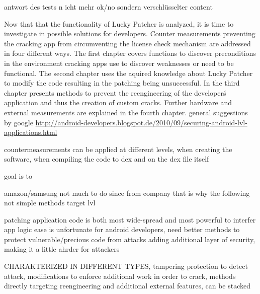 antwort des tests n icht mehr ok/no sondern verschlüsselter content



Now that that the functionality of Lucky Patcher is analyzed, it is time to investigate in possible solutions for developers. Counter measurements preventing the cracking app from circumventing the license check mechanism are addressed in four different ways.\newline
The first chapter covers functions to discover preconditions in the environment cracking apps use to discover weaknesses or need to be functional. The second chapter uses the aquired knowledge about Lucky Patcher to modify the code resulting in the patching being unsuccessful. In the third chapter presents methods to prevent the reengineering of the developer\'s application and thus the creation of custom cracks. Further hardware and external measurements are explained in the fourth chapter.\newline
general suggestions by google  \url{http://android-developers.blogspot.de/2010/09/securing-android-lvl-applications.html}

countermeasurements can be applied at different levels, when creating the software, when compiling the code to dex and on the dex file itself

%
goal is to

amazon/samsung not much to do since from company that is why the following not simple methods target lvl

patching application code is both most wide-spread and most powerful to interfer app logic
ease is unfortunate for android developers, need better methods to protect vulnerable/precious code from attacks
adding additional layer of security, making it a little ahrder for attackers

CHARAKTERIZED IN DIFFERENT TYPES, tampering protection to detect attack, modifications to enforce additional work in order to crack, methods directly targeting reengineering and additional external features, can be stacked
\cite{munteanLicense}
%
